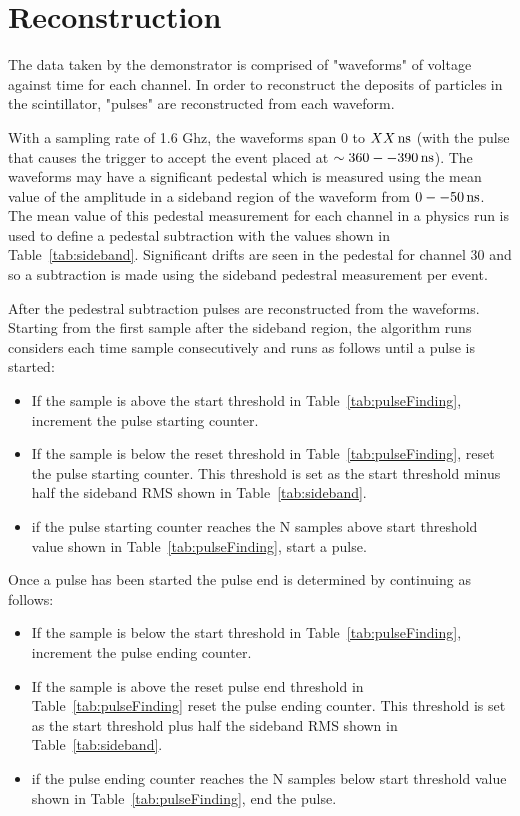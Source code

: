 \documentclass[12pt]{article}
\newcommand{\unit}[1]{\ensuremath{\text{\,#1}}\xspace}
\begin{document}
\section{Reconstruction}

The data taken by the demonstrator is comprised of "waveforms" of voltage against time for each channel.
In order to reconstruct the deposits of particles in the scintillator, "pulses" are reconstructed from
each waveform. 

With a sampling rate of 1.6 Ghz, the waveforms span $0$ to $XX\unit{ns}$ (with the pulse
that causes the trigger to accept the event placed at $\sim360 -- 390 \unit{ns}$).
The waveforms may have a significant pedestal which is measured using the mean
value of the amplitude in a sideband region of the waveform from $0 -- 50 \unit{ns}$.
The mean value of this pedestal measurement for each channel in a physics run 
is used to define a pedestal subtraction with the values
shown in Table~\ref{tab:sideband}. Significant drifts are seen in the pedestal for channel 30
and so a subtraction is made using the sideband pedestral measurement per event.

After the pedestral subtraction pulses are reconstructed from the waveforms. Starting from the first sample after the sideband region, 
the algorithm runs considers each time sample consecutively and runs as follows until a pulse is started:

\begin{itemize}
    \item If the sample is above the start threshold in Table~\ref{tab:pulseFinding}, increment the pulse starting counter.
    \item If the sample is below the reset threshold in Table~\ref{tab:pulseFinding}, reset the pulse starting counter. This threshold is set as the start threshold minus half the sideband RMS shown in Table~\ref{tab:sideband}.
    \item if the pulse starting counter reaches the N samples above start threshold value shown in Table~\ref{tab:pulseFinding}, start a pulse.
\end{itemize}

Once a pulse has been started the pulse end is determined by continuing as follows:

\begin{itemize}
    \item If the sample is below the start threshold in Table~\ref{tab:pulseFinding}, increment the pulse ending counter. 
    \item If the sample is above the reset pulse end threshold in Table~\ref{tab:pulseFinding} reset the pulse ending counter. This threshold is set as the start threshold plus half the sideband RMS shown in Table~\ref{tab:sideband}.
    \item if the pulse ending counter reaches the N samples below start threshold value shown in Table~\ref{tab:pulseFinding}, end the pulse.
\end{itemize}
\end{document}
